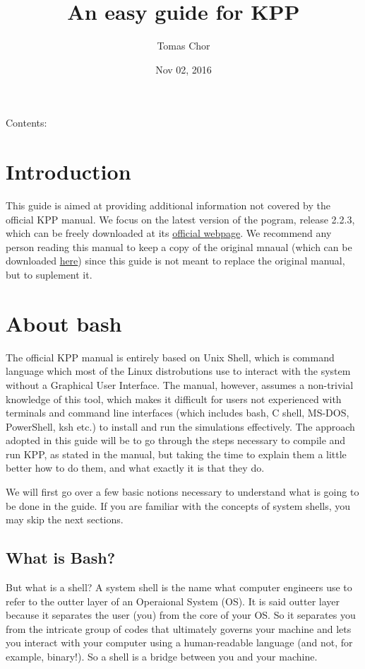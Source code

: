 \documentclass[letterpaper,10pt,openany,oneside]{sphinxmanual}
\title{An easy guide for KPP}
\date{Nov 02, 2016}
\author{Tomas Chor}
\begin{document}
\maketitle
\tableofcontents
{}\label{index::doc}


Contents:


\chapter{Introduction}
\label{intro:introduction}\label{intro:easy-guide-to-compiling-and-running-kpp}\label{intro::doc}
This guide is aimed at providing additional information not covered by the
official KPP manual. We focus on the latest version of the pogram, release
2.2.3, which can be freely downloaded at its \href{http://people.cs.vt.edu/~asandu/Software/Kpp/}{official webpage}. We recommend any person
reading this manual to keep a copy of the original mnaual (which can be
downloaded \href{http://people.cs.vt.edu/~asandu/Software/Kpp/}{here}) since this
guide is not meant to replace the original manual, but to suplement it.


\chapter{About bash}
\label{bash:about-bash}\label{bash::doc}
The official KPP manual is entirely based on Unix Shell, which is command
language which most of the Linux distrobutions use to interact with the system
without a Graphical User Interface. The manual, however, assumes a non-trivial
knowledge of this tool, which makes it difficult for users not experienced with
terminals and command line interfaces (which includes bash, C shell, MS-DOS,
PowerShell, ksh etc.) to install and run the simulations effectively. The
approach adopted in this guide will be to go through the steps necessary to
compile and run KPP, as stated in the manual, but taking the time to explain
them a little better how to do them, and what exactly it is that they do.

We will first go over a few basic notions necessary to understand what is going
to be done in the guide. If you are familiar with the concepts of system shells,
you may skip the next sections.


\section{What is Bash?}
\label{bash:what-is-bash}
But what is a shell? A system shell is the name what computer engineers use to
refer to the outter layer of an Operaional System (OS). It is said outter layer
because it separates the user (you) from the core of your OS. So it separates
you from the intricate group of codes that ultimately governs your machine and
lets you interact with your computer using a human-readable language (and not,
for example, binary!). So a shell is a bridge between you and your machine.
\end{document}
